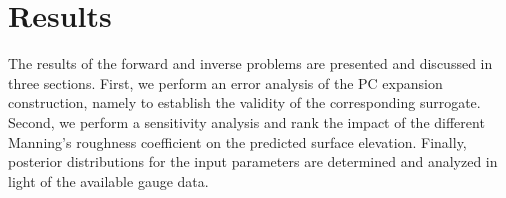 \section{Results}
\label{sec:results}
The results of the forward and inverse problems are presented and 
discussed in three sections. First, we perform an error analysis 
of the PC expansion construction, namely  to establish the 
validity of the corresponding surrogate.  Second, we perform a 
sensitivity analysis and rank the impact of the different Manning's 
roughness coefficient on the predicted surface elevation. Finally, 
posterior distributions for the input parameters are determined 
and analyzed in light of the available gauge data.



